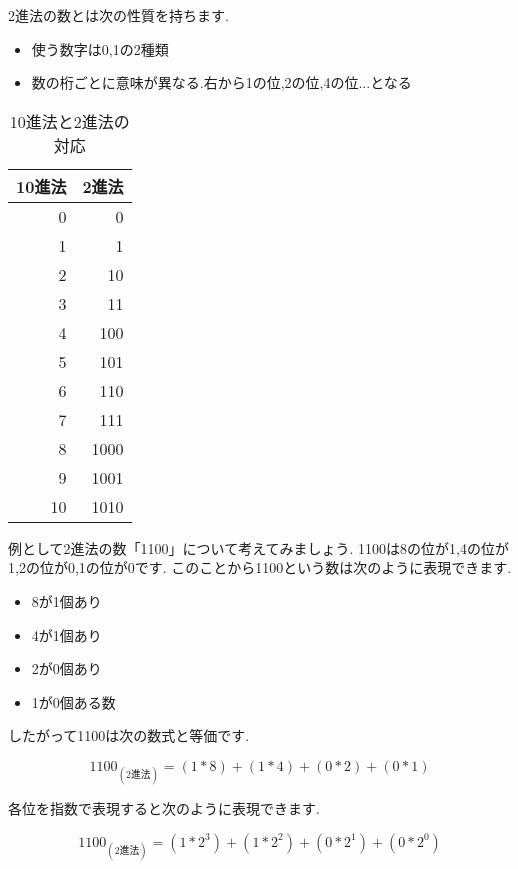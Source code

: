 \documentclass[10pt, twocolumn]{jarticle}
\begin{document}
2進法の数とは次の性質を持ちます.

\begin{itemize}
  \item 使う数字は0,1の2種類
  \item 数の桁ごとに意味が異なる.右から1の位,2の位,4の位...となる
\end{itemize}

\begin{table}[h]
\begin{center}
\caption{10進法と2進法の対応}
\begin{tabular}{|r|r|}\hline
  10進法 & 2進法 \\ \hline\hline
       0 &     0 \\ \hline
       1 &     1 \\ \hline
       2 &    10 \\ \hline
       3 &    11 \\ \hline
       4 &   100 \\ \hline
       5 &   101 \\ \hline
       6 &   110 \\ \hline
       7 &   111 \\ \hline
       8 &  1000 \\ \hline
       9 &  1001 \\ \hline
      10 &  1010 \\ \hline
\end{tabular}
\end{center}
\end{table}

例として2進法の数「1100」について考えてみましょう.
1100は8の位が1,4の位が1,2の位が0,1の位が0です.
このことから1100という数は次のように表現できます.

\begin{itemize}
  \item 8が1個あり
  \item 4が1個あり
  \item 2が0個あり
  \item 1が0個ある数
\end{itemize}

したがって1100は次の数式と等価です.

\begin{displaymath}
1100_{(2進法)} = (1 * 8) + (1 * 4) + (0 * 2) + (0 * 1)
\end{displaymath}

各位を指数で表現すると次のように表現できます.

\begin{displaymath}
1100_{(2進法)} = (1 * 2^3) + (1 * 2^2) + (0 * 2^1) + (0 * 2^0)
\end{displaymath}
\end{document}
